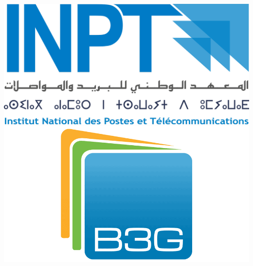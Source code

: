 
\thispagestyle{empty}
\includegraphics[scale=0.08]{Logos/Logo_INPT.png}
\hspace{11cm}
\includegraphics[scale=0.1]{Logos/b3g-vector-logo.png}

